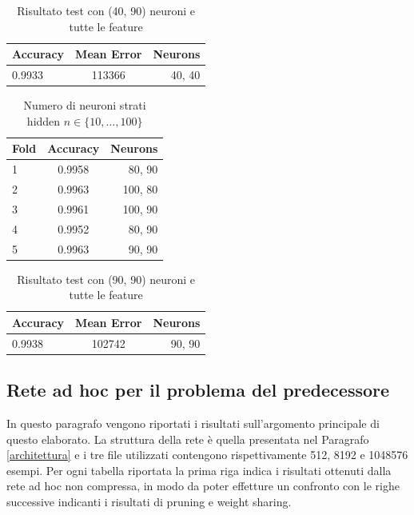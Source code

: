 \documentclass[12pt]{report}
\begin{document}
\begin{table}[H]
\begin{center}
\begin{tabular}{lcr}
\toprule
Accuracy & Mean Error & Neurons \\
\midrule
0.9933 & 113366 & 40, 40\\
\bottomrule
\end{tabular}
\end{center}
\caption{Risultato test con (40, 90) neuroni e tutte le feature}
\label{hoc_all_test_40}
\end{table}

\newpage

\begin{table}[H]
\begin{center}
\begin{tabular}{lcr}
\toprule
Fold & Accuracy & Neurons \\
\midrule
1 & 0.9958 & 80, 90\\
2 & 0.9963 & 100, 80\\
3 & 0.9961 & 100, 90\\
4 & 0.9952 & 80, 90\\
5 & 0.9963 & 90, 90\\
\bottomrule
\end{tabular}
\end{center}
\caption{Numero di neuroni strati hidden $n \in \{10, \dots, 100 \}$}
\label{hoc2_10_100}
\end{table}

\begin{table}[H]
\begin{center}
\begin{tabular}{lcr}
\toprule
Accuracy & Mean Error & Neurons \\
\midrule
0.9938 & 102742 & 90, 90\\
\bottomrule
\end{tabular}
\end{center}
\caption{Risultato test con (90, 90) neuroni e tutte le feature}
\label{hoc_all_test_100}
\end{table}

\newpage

\subsection{Rete ad hoc per il problema del predecessore}
In questo paragrafo vengono riportati i risultati sull'argomento principale di questo elaborato.
La struttura della rete è quella presentata nel Paragrafo \ref{architettura} e i tre file utilizzati contengono rispettivamente 512, 8192 e 1048576 esempi.
Per ogni tabella riportata la prima riga indica i risultati ottenuti dalla rete ad hoc non compressa, in modo da poter effetture un confronto con le righe successive indicanti i risultati di pruning e weight sharing.
\end{document}

